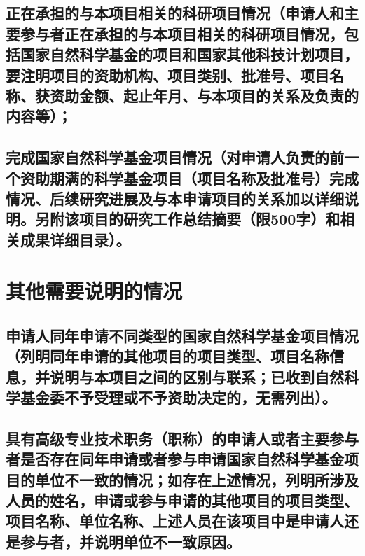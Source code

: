 \documentclass[UTF8, punct, oneside,fontset=none]{ctexbook}
\begin{document}
\begin{MS}
	
\end{MS}

\section{\textbf{正在承担的与本项目相关的科研项目情况}\kg{0.3em}（申请人和主要参与者正在承担的与本项目相关的科研项目情况，包括国家自然科学基金的项目和国家其他科技计划项目，要注明项目的资助机构、\kg{0.1em}项目类别、\kg{0.1em}批准号、\kg{0.1em}项目名称、获资助金额、起止年月、与本项目的关系及负责的内容等）；}

\begin{MS}
	
\end{MS}


\section{\textbf{完成国家自然科学基金项目情况}\kg{0.2em}（对申请人负责的前一个资助期满的科学基金项目（项目名称及批准号）完成情况、后续研究进展及与本申请项目的关系加以详细说明。另附该项目的研究工作总结摘要（限500字）和相关成果详细目录）。}

\begin{MS}
	
\end{MS}

\chapter{\textbf{其他需要说明的情况}}
\section{申请人同年申请不同类型的国家自然科学基金项目情况\kg{0.2em}（列明同年申请的其他项目的项目类型、项目名称信息，并说明与本项目之间的区别与联系；已收到自然科学基金委不予受理或不予资助决定的，无需列出）。}

\begin{MS}
	
\end{MS}

\section{具有高级专业技术职务\kg{0.3em}（职称）\kg{0.3em}的申请人或者主要参与者是否存在同年申\kg{0.1em}请\kg{0.1em}或者\kg{0.1em}参与申请国家自然科学基金项目的单位不一致的情况；如存在上述情况，列明所涉及人员的姓名，申请或参与申请的其他项目的项目类型、项目名称、单位名称、上述人员在该项目中是申请人还是参与者，并说明单位不一致原因。}
\end{document}
